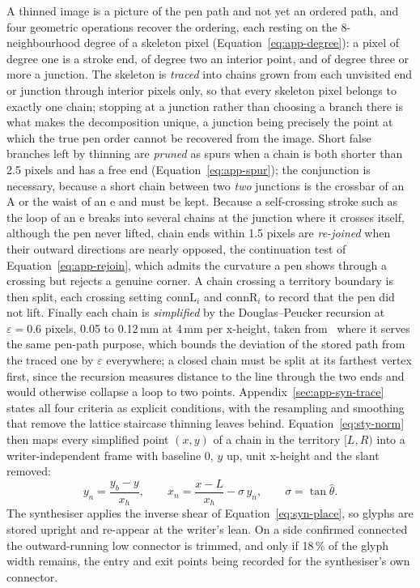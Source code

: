 A thinned image is a picture of the pen path and not yet an ordered path, and four geometric operations recover the ordering, each resting on the 8-neighbourhood degree of a skeleton pixel (Equation~\ref{eq:app-degree}): a pixel of degree one is a stroke end, of degree two an interior point, and of degree three or more a junction.
The skeleton is \emph{traced} into chains grown from each unvisited end or junction through interior pixels only, so that every skeleton pixel belongs to exactly one chain; stopping at a junction rather than choosing a branch there is what makes the decomposition unique, a junction being precisely the point at which the true pen order cannot be recovered from the image.
Short false branches left by thinning are \emph{pruned} as spurs when a chain is both shorter than 2.5 pixels and has a free end (Equation~\ref{eq:app-spur}); the conjunction is necessary, because a short chain between two \emph{two} junctions is the crossbar of an A or the waist of an e and must be kept.
Because a self-crossing stroke such as the loop of an e breaks into several chains at the junction where it crosses itself, although the pen never lifted, chain ends within 1.5 pixels are \emph{re-joined} when their outward directions are nearly opposed, the continuation test of Equation~\ref{eq:app-rejoin}, which admits the curvature a pen shows through a crossing but rejects a genuine corner.
A chain crossing a territory boundary is then split, each crossing setting $\mathrm{connL}_i$ and $\mathrm{connR}_i$ to record that the pen did not lift.
Finally each chain is \emph{simplified} by the Douglas--Peucker recursion at $\varepsilon=0.6$ pixels, 0.05 to 0.12\,mm at 4\,mm per x-height, taken from~\cite{teikari2016} where it serves the same pen-path purpose, which bounds the deviation of the stored path from the traced one by $\varepsilon$ everywhere; a closed chain must be split at its farthest vertex first, since the recursion measures distance to the line through the two ends and would otherwise collapse a loop to two points.
Appendix~\ref{sec:app-syn-trace} states all four criteria as explicit conditions, with the resampling and smoothing that remove the lattice staircase thinning leaves behind.
Equation~\ref{eq:sty-norm} then maps every simplified point $(x,y)$ of a chain in the territory $[L,R)$ into a writer-independent frame with baseline 0, $y$ up, unit x-height and the slant removed:
\begin{equation}
y_n=\frac{y_b-y}{x_h},\qquad x_n=\frac{x-L}{x_h}-\sigma\,y_n,\qquad\sigma=\tan\hat\theta .
\label{eq:sty-norm}
\end{equation}
The synthesiser applies the inverse shear of Equation~\ref{eq:syn-place}, so glyphs are stored upright and re-appear at the writer's lean.
On a side confirmed connected the outward-running low connector is trimmed, and only if 18\,\% of the glyph width remains, the entry and exit points being recorded for the synthesiser's own connector.

